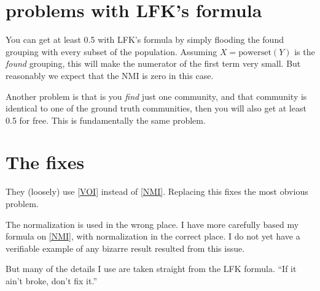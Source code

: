 \documentclass[9pt,technote]{IEEEtran}
\begin{document}

\section{problems with LFK's formula}
\label{sec:Flood}

You can get at least 0.5 with LFK's formula by simply flooding the found grouping with every subset of the population.
Assuming $X = \mbox{powerset}(Y)$ is the \emph{found} grouping, this will make the numerator of the first term
very small. But reasonably we expect that the NMI is zero in this case.

Another problem is that is you \emph{find} just one community, and that community is identical to one of the
ground truth communities, then you will also get at least 0.5 for free. This is fundamentally the same problem.

\section{The fixes}
They (loosely) use \cref{VOI} instead of \cref{NMI}. Replacing this fixes the most obvious problem.

The normalization is used in the wrong place.
I have more carefully based my formula on \cref{NMI}, with normalization in the correct place.
I do not yet have a verifiable example of any bizarre result resulted from this issue.

But many of the details I use are taken straight from the LFK formula. ``If it ain't broke, don't fix it.''
\end{document}
